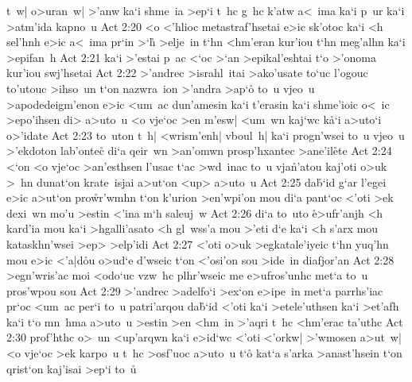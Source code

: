t~w|
o>uran~w|
>'anw
ka`i
shme~ia
>ep`i
t~hc
g~hc
k'atw
a<~ima
ka`i
p~ur
ka`i
>atm'ida
kapno~u\bibvsend
\vs Act 2:20
<o
<'hlioc
metastraf'hsetai
e>ic
sk'otoc
ka`i
<h
sel'hnh
e>ic
a<~ima
pr`in
>`h\r{}
>elje~in
t`hn
<hm'eran
kur'iou
t`hn
meg'alhn
ka`i
>epifan~h\bibvsend
\vs Act 2:21
ka`i
>'estai
p~ac
<`oc
>`an
>epikal'eshtai
t`o
>'onoma
kur'iou
swj'hsetai\bibvsend
\vs Act 2:22
>'andrec
>israhl~itai
>ako'usate
to`uc
l'ogouc
to'utouc
>ihso~un
t`on
nazwra~ion
>'andra
>ap`o\r{}
to~u
vjeo~u
>apodedeigm'enon
e>ic
<um~ac
dun'amesin
ka`i
t'erasin
ka`i
shme'ioic
o<~ic
>epo'ihsen
di>
a>uto~u
<o
vje`oc
>en
m'esw|
<um~wn
kaj`wc
k\r{a}`i
a>uto`i
o>'idate\bibvsend
\vs Act 2:23
to~uton
t~h|
<wrism'enh|
vboul~h|
ka`i
progn'wsei
to~u
vjeo~u
>'ekdoton
lab'ontec\r{}
di`a
qeir~wn
>an'omwn
prosp'hxantec
>ane'il\r{e}te\bibvsend
{}
\vs Act 2:24
<`on
<o
vje`oc
>an'esthsen
l'usac
t`ac
>wd~inac
to~u
vja\r{n}'atou
kaj'oti
o>uk
>~hn
dunat`on
krate~isjai
a>ut`on
<up>
a>uto~u\bibvsend
\vs Act 2:25
da\r{b}`id
g`ar
l'egei
e>ic
a>ut`on
pro\r{w}r'wmhn
t`on
k'urion
>en'wpi'on
mou
di`a
pant`oc
<'oti
>ek
dexi~wn
mo'u
>estin
<'ina
m`h
saleuj~w\bibvsend
\vs Act 2:26
di`a
to~uto
\r{e}>ufr'anjh
<h
kard'ia
mou
ka`i
>hgalli'asato
<h
gl~wss'a
mou
>'eti
d`e
ka`i
<h
s'arx
mou
kataskhn'wsei
>ep>
>elp'idi\bibvsend
\vs Act 2:27
<'oti
o>uk
>egkatale'iyeic
t`hn
yuq'hn
mou
e>ic
<'a|d\r{o}u
o>ud`e
d'wseic
t`on
<'osi'on
sou
>ide~in
diafjor'an\bibvsend
\vs Act 2:28
>egn'wris'ac
moi
<odo`uc
vzw~hc
plhr'wseic
me
e>ufros'unhc
met`a
to~u
pros'wpou
sou\bibvsend
\vs Act 2:29
>'andrec
>adelfo`i
>ex`on
e>ipe~in
met`a
parrhs'iac
pr`oc
<um~ac
per`i
to~u
patri'arqou
da\r{b}`id
<'oti
ka`i
>etele'uthsen
ka`i
>et'afh
ka`i
t`o
mn~hma
a>uto~u
>estin
>en
<hm~in
>'aqri
t~hc
<hm'erac
ta'uthc\bibvsend
\vs Act 2:30
prof'hthc
o>~un
<up'arqwn
ka`i
e>id`wc
<'oti
<'orkw|
>'wmosen
a>ut~w|
<o
vje`oc
>ek
karpo~u
t~hc
>osf'uoc
a>uto~u
t`o\r{}
kat`a
s'arka
>anast'hsein
t`on
qrist`on
kaj'isai
>ep`i
to~u\r{}
